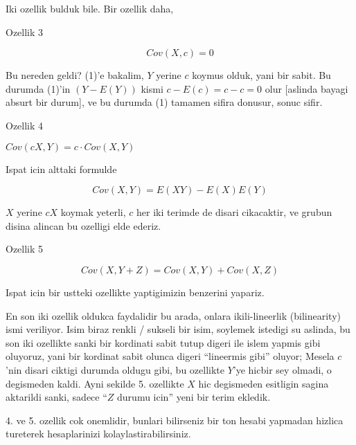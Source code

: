 \documentclass[12pt,fleqn]{article}\usepackage{../common}
\begin{document}
Iki ozellik bulduk bile. Bir ozellik daha,

Ozellik 3

$$ Cov(X,c) = 0 $$

Bu nereden geldi? (1)'e bakalim, $Y$ yerine $c$ koymus olduk, yani bir
sabit. Bu durumda (1)'in $(Y-E(Y))$ kismi $c-E(c)=c-c=0$ olur [aslinda
bayagi absurt bir durum], ve bu durumda (1) tamamen sifira donusur, sonuc sifir.

Ozellik 4

$Cov(cX,Y) = c \cdot Cov(X,Y)$ 

Ispat icin alttaki formulde

$$ Cov(X,Y) =  E(XY) - E(X)E(Y) $$

$X$ yerine $cX$ koymak yeterli, $c$ her iki terimde de disari cikacaktir,
ve grubun disina alincan bu ozelligi elde ederiz.

Ozellik 5

$$ Cov(X,Y+Z) = Cov(X,Y) + Cov(X,Z) $$

Ispat icin bir ustteki ozellikte yaptigimizin benzerini yapariz. 

En son iki ozellik oldukca faydalidir bu arada, onlara ikili-lineerlik
(bilinearity) ismi veriliyor. Isim biraz renkli / sukseli bir isim,
soylemek istedigi su aslinda, bu son iki ozellikte sanki bir kordinati
sabit tutup digeri ile islem yapmis gibi oluyoruz, yani bir kordinat sabit
olunca digeri ``lineermis gibi'' oluyor; Mesela $c$'nin disari ciktigi
durumda oldugu gibi, bu ozellikte $Y$'ye hicbir sey olmadi, o degismeden
kaldi. Ayni sekilde 5. ozellikte $X$ hic degismeden esitligin sagina
aktarildi sanki, sadece ``$Z$ durumu icin'' yeni bir terim ekledik. 

4. ve 5. ozellik cok onemlidir, bunlari bilirseniz bir ton hesabi yapmadan
hizlica tureterek hesaplarinizi kolaylastirabilirsiniz. 
\end{document}
